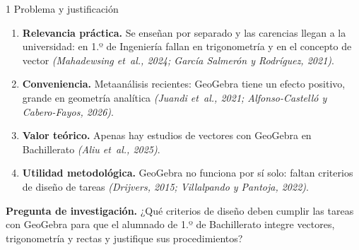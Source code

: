 \documentclass[11pt]{article}
\begin{document}
\begin{minipage}[t]{0.315\linewidth}
\begin{bloque}[height=11.3cm]{1 \textperiodcentered{} Problema y justificación}
\begin{enumerate}
  \item \textbf{Relevancia práctica.} Se enseñan por separado y las carencias llegan a la universidad: en 1.º de Ingeniería fallan en trigonometría y en el concepto de vector \emph{(Mahadewsing et~al., 2024; García Salmerón y Rodríguez, 2021)}.
  \item \textbf{Conveniencia.} Metaanálisis recientes: GeoGebra tiene un efecto positivo, grande en geometría analítica \emph{(Juandi et~al., 2021; Alfonso-Castelló y Cabero-Fayos, 2026)}.
  \item \textbf{Valor teórico.} Apenas hay estudios de vectores con GeoGebra en Bachillerato \emph{(Aliu et~al., 2025)}.
  \item \textbf{Utilidad metodológica.} GeoGebra no funciona por sí solo: faltan criterios de diseño de tareas \emph{(Drijvers, 2015; Villalpando y Pantoja, 2022)}.
\end{enumerate}
\vspace{4pt}
\begin{destacado}
\textbf{\color{urjc}Pregunta de investigación.} ¿Qué criterios de diseño deben cumplir las tareas con GeoGebra para que el alumnado de 1.º de Bachillerato integre vectores, trigonometría y rectas y justifique sus procedimientos?
\end{destacado}
\end{bloque}
\end{minipage}\hfill
\end{document}
